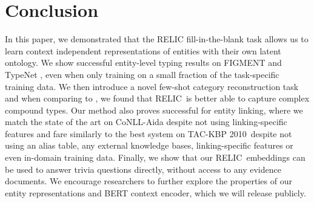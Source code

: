\documentclass{article} \usepackage{iclr2020_conference,times}
\newcommand{\ack}{RELIC\xspace}
\newcommand{\tac}{TAC-KBP 2010}
\begin{document}
\section{Conclusion}
\label{sec:conclusion}

In this paper, we demonstrated that the \ack fill-in-the-blank task allows us to learn context independent representations of entities with their own latent ontology.
We show successful entity-level typing results on FIGMENT \citep{yaghoobzadeh2015corpus} and TypeNet \citep{murty2018hierarchical}, even when only training on a small fraction of the task-specific training data.
We then introduce a novel few-shot category reconstruction task and when comparing to \citet{yamada-etal-2017-learning}, we found that \ack~is better able to capture complex compound types.  
Our method also proves successful for entity linking, where we match the state of the art on CoNLL-Aida despite not using linking-specific features and fare similarly to the best system on \tac~despite not using an alias table, any external knowledge bases, linking-specific features or even in-domain training data.
Finally, we show that our \ack~embeddings can be used to answer trivia questions directly, without access to any evidence documents. 
We encourage researchers to further explore the properties of our entity representations and BERT context encoder, which we will release publicly.



%
 
\clearpage



\end{document}
